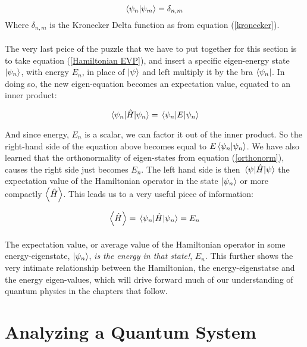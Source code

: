 \documentclass[12pt,letterpaper]{book}
\begin{document}
\begin{equation}
\label{orthonorm}
\braket{\psi_n}{\psi_m} = \delta_{n,m}
\end{equation}
Where $\delta_{n,m}$ is the Kronecker Delta function as from equation (\ref{kronecker}).

\paragraph*{}The very last peice of the puzzle that we have to put together for this section is to take equation (\ref{Hamiltonian EVP}), and insert a specific eigen-energy state $\ket{\psi_n}$, with energy $E_n$, in place of $\ket{\psi}$ and left multiply it by the bra 
$\bra{\psi_n}$. In doing so, the new eigen-equation becomes an expectation value, equated to an inner product:

\begin{equation}
\expval{\hat{H}}{\psi_n} = \expval{E}{\psi_n}
\end{equation}

And since energy, $E_n$ is a scalar, we can factor it out of the inner product. So the right-hand side of the equation above becomes equal to $E\braket{\psi_n}{\psi_n}$. We have also learned that the orthonormality of eigen-states from equation (\ref{orthonorm}), causes the right side just becomes $E_n$. The left hand side is then $\expval{\hat{H}}{\psi}$ the expectation value of the Hamiltonian operator in the state $\ket{\psi_n}$ or more compactly $\expval{\hat{H}}$. This leads us to a very useful piece of information:

\begin{equation} 
\expval{\hat{H}} = \expval{\hat{H}}{\psi_n} = E_n
\end{equation}

\paragraph*{}The expectation value, or average value of the Hamiltonian operator in some energy-eigenstate, $\ket{\psi_n}$, \textit{is the energy in that state!}, $E_n$. This further shows the very intimate relationship between the Hamiltonian, the energy-eigenstatse and the energy eigen-values, which will drive forward much of our understanding of quantum physics in the chapters that follow.


\section{Analyzing a Quantum System}
\end{document}
